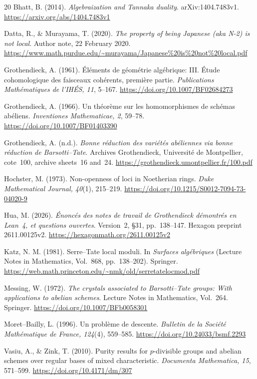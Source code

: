 \documentclass[11pt]{article}
\theoremstyle{definition}\newtheorem{definition}[theorem]{Definition}
\theoremstyle{remark}\newtheorem{remark}[theorem]{Remark}
\begin{document}
\begin{thebibliography}{20}
Bhatt, B. (2014). \emph{Algebraization and Tannaka duality}. arXiv:1404.7483v1. \url{https://arxiv.org/abs/1404.7483v1}

Datta, R., \& Murayama, T. (2020). \emph{The property of being Japanese (aka N-2) is not local}. Author note, 22 February 2020. \url{https://www.math.purdue.edu/~murayama/Japanese%20is%20not%20local.pdf}

Grothendieck, A. (1961). \'El\'ements de g\'eom\'etrie alg\'ebrique: III. \'Etude cohomologique des faisceaux coh\'erents, premi\`ere partie. \emph{Publications Math\'ematiques de l'IH\'ES, 11}, 5--167. \url{https://doi.org/10.1007/BF02684273}

Grothendieck, A. (1966). Un th\'eor\`eme sur les homomorphismes de sch\'emas ab\'eliens. \emph{Inventiones Mathematicae, 2}, 59--78. \url{https://doi.org/10.1007/BF01403390}

Grothendieck, A. (n.d.). \emph{Bonne r\'eduction des vari\'et\'es ab\'eliennes via bonne r\'eduction de Barsotti--Tate}. Archives Grothendieck, Universit\'e de Montpellier, cote~100, archive sheets~16 and~24. \url{https://grothendieck.umontpellier.fr/100.pdf}

Hochster, M. (1973). Non-openness of loci in Noetherian rings. \emph{Duke Mathematical Journal, 40}(1), 215--219. \url{https://doi.org/10.1215/S0012-7094-73-04020-9}

Hua, M. (2026). \emph{\'Enonc\'es des notes de travail de Grothendieck d\'emontr\'es en Lean~4, et questions ouvertes}. Version~2, \S31, pp.~138--147. Hexagon preprint 2611.00125v2. \url{https://hexagonmath.org/2611.00125v2}

Katz, N. M. (1981). Serre--Tate local moduli. In \emph{Surfaces alg\'ebriques} (Lecture Notes in Mathematics, Vol.~868, pp.~138--202). Springer. \url{https://web.math.princeton.edu/~nmk/old/serretatelocmod.pdf}

Messing, W. (1972). \emph{The crystals associated to Barsotti--Tate groups: With applications to abelian schemes}. Lecture Notes in Mathematics, Vol.~264. Springer. \url{https://doi.org/10.1007/BFb0058301}

Moret--Bailly, L. (1996). Un probl\`eme de descente. \emph{Bulletin de la Soci\'et\'e Math\'ematique de France, 124}(4), 559--585. \url{https://doi.org/10.24033/bsmf.2293}

Vasiu, A., \& Zink, T. (2010). Purity results for $p$-divisible groups and abelian schemes over regular bases of mixed characteristic. \emph{Documenta Mathematica, 15}, 571--599. \url{https://doi.org/10.4171/dm/307}
\end{thebibliography}
\end{document}
